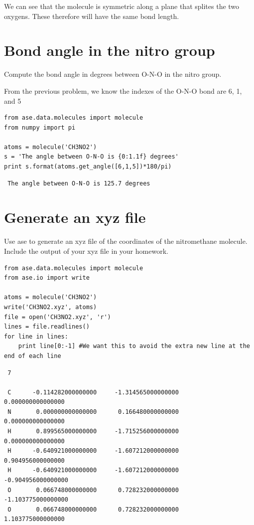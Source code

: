 \documentclass[11pt]{article}
\begin{document}
We can see that the molecule is symmetric along a plane that splites the
two oxygens. These therefore will have the same bond length.
\section{Bond angle in the nitro group}
\label{sec-5}

Compute the bond angle in degrees between O-N-O in the nitro group.

From the previous problem, we know the indexes of the O-N-O bond are 6, 1, and 5


\begin{verbatim}
from ase.data.molecules import molecule
from numpy import pi

atoms = molecule('CH3NO2')
s = 'The angle between O-N-O is {0:1.1f} degrees'
print s.format(atoms.get_angle([6,1,5])*180/pi)
\end{verbatim}

\begin{verbatim}
 The angle between O-N-O is 125.7 degrees
\end{verbatim}
\section{Generate an xyz file}
\label{sec-6}

Use ase to generate an xyz file of the coordinates of the nitromethane
molecule. Include the output of your xyz file in your homework.


\begin{verbatim}
from ase.data.molecules import molecule
from ase.io import write

atoms = molecule('CH3NO2')
write('CH3NO2.xyz', atoms)
file = open('CH3NO2.xyz', 'r')
lines = file.readlines()
for line in lines:
    print line[0:-1] #We want this to avoid the extra new line at the end of each line
\end{verbatim}

\begin{verbatim}
 7
 
 C      -0.114282000000000     -1.314565000000000      0.000000000000000
 N       0.000000000000000      0.166480000000000      0.000000000000000
 H       0.899565000000000     -1.715256000000000      0.000000000000000
 H      -0.640921000000000     -1.607212000000000      0.904956000000000
 H      -0.640921000000000     -1.607212000000000     -0.904956000000000
 O       0.066748000000000      0.728232000000000     -1.103775000000000
 O       0.066748000000000      0.728232000000000      1.103775000000000
\end{verbatim}
\end{document}
